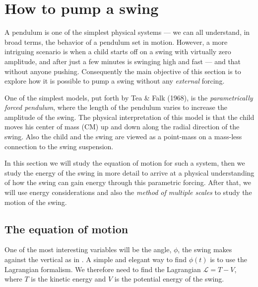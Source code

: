 
\section{How to pump a swing}
A pendulum is one of the simplest physical systems --- we can all
understand, in broad terms, the behavior of a pendulum set in
motion. However, a more intriguing scenario is when a child starts off
on a swing with virtually zero amplitude, and after just a few minutes
is swinging high and fast --- and that without anyone pushing.
Consequently the main objective of this section is to explore how it
is possible to pump a swing without any \emph{external} forcing. 

One of the simplest models, put forth by Tea \& Falk (1968), %
is the \emph{parametrically forced pendulum}, where the length of the
pendulum varies to increase the amplitude of the swing. The physical
interpretation of this model is that the child moves his center of
mass (CM) up and down along the radial direction of the swing. Also
the child and the swing are viewed as a point-mass on a mass-less
connection to the swing suspension. 

In this section we will study the equation of motion for such a system,
then we study the energy of the swing in more detail to arrive at a
physical understanding of how the swing can gain energy through this
parametric forcing. 
After that, we will use energy considerations and also the
\emph{method of multiple scales} to study the motion of the swing.

\subsection{The equation of motion}
One of the most interesting variables will be the angle, $\phi$,
the swing makes against the vertical as in . 
A simple and elegant way to find $\phi(t)$ is to use the Lagrangian
formalism. We therefore need to find the Lagrangian $\mathcal{L}=T-V$,
where $T$ is the kinetic energy and $V$ is the potential energy of the
swing. 

